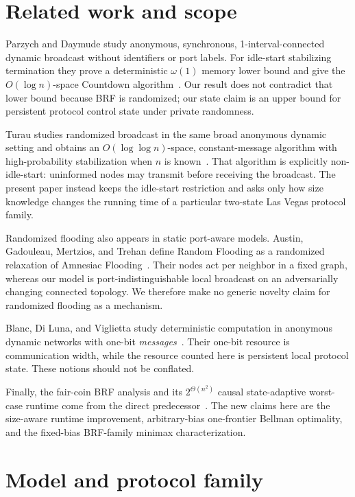 \documentclass[11pt]{article}
\begin{document}
\section{Related work and scope}
Parzych and Daymude study anonymous, synchronous, 1-interval-connected dynamic broadcast without identifiers or port labels.  For idle-start stabilizing termination they prove a deterministic $\omega(1)$ memory lower bound and give the $O(\log n)$-space Countdown algorithm~\cite{parzych2024}.  Our result does not contradict that lower bound because BRF is randomized; our state claim is an upper bound for persistent protocol control state under private randomness.

Turau studies randomized broadcast in the same broad anonymous dynamic setting and obtains an $O(\log\log n)$-space, constant-message algorithm with high-probability stabilization when $n$ is known~\cite{turau2026}.  That algorithm is explicitly non-idle-start: uninformed nodes may transmit before receiving the broadcast.  The present paper instead keeps the idle-start restriction and asks only how size knowledge changes the running time of a particular two-state Las Vegas protocol family.

Randomized flooding also appears in static port-aware models.  Austin, Gadouleau, Mertzios, and Trehan define Random Flooding as a randomized relaxation of Amnesiac Flooding~\cite{austin2025}.  Their nodes act per neighbor in a fixed graph, whereas our model is port-indistinguishable local broadcast on an adversarially changing connected topology.  We therefore make no generic novelty claim for randomized flooding as a mechanism.

Blanc, Di Luna, and Viglietta study deterministic computation in anonymous dynamic networks with one-bit \emph{messages}~\cite{blanc2026}.  Their one-bit resource is communication width, while the resource counted here is persistent local protocol state.  These notions should not be conflated.

Finally, the fair-coin BRF analysis and its $2^{\Theta(n^2)}$ causal state-adaptive worst-case runtime come from the direct predecessor~\cite{yonezu2026brf}.  The new claims here are the size-aware runtime improvement, arbitrary-bias one-frontier Bellman optimality, and the fixed-bias BRF-family minimax characterization.

\section{Model and protocol family}
\end{document}
